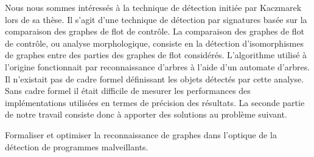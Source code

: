 Nous nous sommes intéressés à la technique de détection initiée par Kaczmarek \cite{BKM08} lors de sa thèse. Il s'agit d'une technique de détection par signatures basée sur la comparaison des graphes de flot de contrôle. %
La comparaison des graphes de flot de contrôle, ou analyse morphologique, consiste en la détection d'isomorphismes de graphes entre des parties des graphes de flot considérés. 
L'algorithme utilisé à l'origine fonctionnait par reconnaissance d'arbres à l'aide d'un automate d'arbres. Il n'existait pas de cadre formel définissant les objets détectés par cette analyse. Sans cadre formel il était difficile de mesurer les performances des implémentations utilisées en termes de précision des résultats.
La seconde partie de notre travail consiste donc à apporter des solutions au problème suivant.
\begin{pbb}
 Formaliser et optimiser la reconnaissance de graphes dans l'optique de la détection de programmes malveillants.
\end{pbb}












